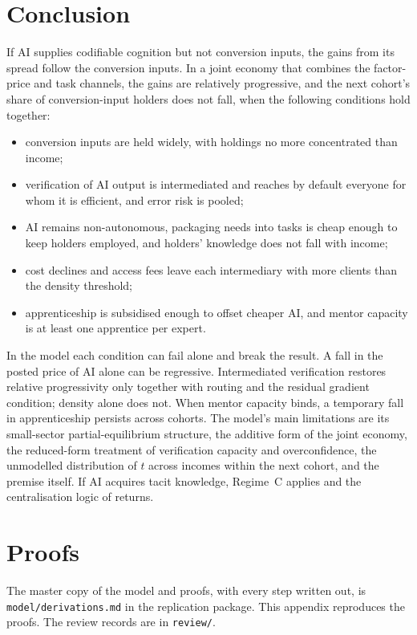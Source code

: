 \documentclass[12pt]{article}
\theoremstyle{remark}
\begin{document}
\section{Conclusion}\label{sec:conclusion}

If AI supplies codifiable cognition but not conversion inputs, the gains from its spread follow the conversion inputs. In a joint economy that combines the factor-price and task channels, the gains are relatively progressive, and the next cohort's share of conversion-input holders does not fall, when the following conditions hold together:
\begin{itemize}[itemsep=0pt]
\item conversion inputs are held widely, with holdings no more concentrated than income;
\item verification of AI output is intermediated and reaches by default everyone for whom it is efficient, and error risk is pooled;
\item AI remains non-autonomous, packaging needs into tasks is cheap enough to keep holders employed, and holders' knowledge does not fall with income;
\item cost declines and access fees leave each intermediary with more clients than the density threshold;
\item apprenticeship is subsidised enough to offset cheaper AI, and mentor capacity is at least one apprentice per expert.
\end{itemize}
In the model each condition can fail alone and break the result. A fall in the posted price of AI alone can be regressive. Intermediated verification restores relative progressivity only together with routing and the residual gradient condition; density alone does not. When mentor capacity binds, a temporary fall in apprenticeship persists across cohorts. The model's main limitations are its small-sector partial-equilibrium structure, the additive form of the joint economy, the reduced-form treatment of verification capacity and overconfidence, the unmodelled distribution of $t$ across incomes within the next cohort, and the premise itself. If AI acquires tacit knowledge, Regime~C applies and the centralisation logic of \citet{brynjolfsson2026hayek} returns.

\appendix
\sloppy
\section{Proofs}\label{app:proofs}

The master copy of the model and proofs, with every step written out, is \texttt{model/derivations.md} in the replication package. This appendix reproduces the proofs. The review records are in \texttt{review/}.
\end{document}

